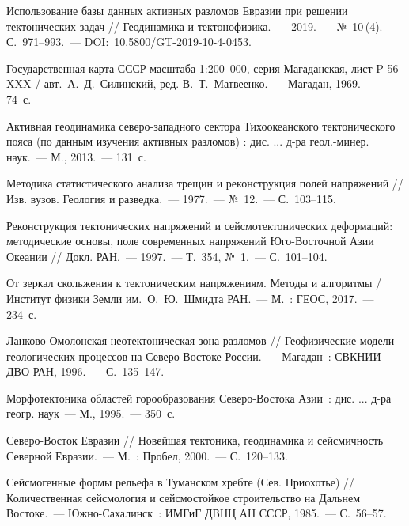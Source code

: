 \begin{thebibliography}{99}
\bibitem{} Использование базы данных активных разломов Евразии при решении тектонических задач // Геодинамика и тектонофизика.~--- 2019.~--- №~10\,(4).~--- С.~971--993.~--- DOI:~10.5800/GT-2019-10-4-0453.

\bibitem{}Государственная карта СССР масштаба 1:200 000, серия Магаданская, лист P-56-XXX / авт.~А.~Д.~Силинский, ред. В.~Т.~Матвеенко.~--- Магадан, 1969.~--- 74~с.

\bibitem{} Активная геодинамика северо-западного сектора Тихоокеанского тектонического пояса (по данным изучения активных разломов) : дис. ... д-ра геол.-минер. наук.~--- М., 2013.~--- 131~с.

\bibitem{} Методика статистического анализа трещин и реконструкция полей напряжений // Изв. вузов. Геология и разведка.~--- 1977.~--- №~12.~--- С.~103--115.

\bibitem{} Реконструкция тектонических напряжений и сейсмотектонических деформаций: методические основы, поле современных напряжений Юго-Восточной Азии Океании // Докл. РАН.~--- 1997.~--- Т.~354, №~1.~--- С.~101--104.

\bibitem{} От зеркал скольжения к тектоническим напряжениям. Методы и алгоритмы / Институт физики Земли им.~О.~Ю.~Шмидта РАН.~--- М.~: ГЕОС, 2017.~--- 234~с.

\bibitem{} Ланково-Омолонская неотектоническая зона разломов // Геофизические модели геологических процессов на Северо-Востоке России.~--- Магадан~: СВКНИИ ДВО РАН, 1996.~--- С.~135--147.

\bibitem{} Морфотектоника областей горообразования Северо-Востока Азии~: дис. ... д-ра геогр. наук~--- М., 1995.~--- 350~с.

\bibitem{} Северо-Восток Евразии // Новейшая тектоника, геодинамика и сейсмичность Северной Евразии.~--- М.~: Пробел, 2000.~--- С.~120--133.

\bibitem{} Сейсмогенные формы рельефа в Туманском хребте (Сев. Приохотье) // Количественная сейсмология  и  сейсмостойкое  строительство  на  Дальнем  Востоке.~--- Южно-Сахалинск~: ИМГиГ ДВНЦ АН СССР, 1985.~--- С.~56--57.
\end{thebibliography}
